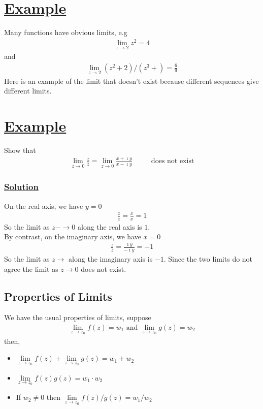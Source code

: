 \documentclass[12pt]{report}
\newcommand{\ubt}[1]{\textbf{\underline{#1}}}
\newcommand{\zbar}{\overline{z}}
\newcommand{\imaginary}{\imath}
\newcommand{\example}[1]{\section*{\ubt{Example #1}}}
\newcommand{\solution}{\subsubsection{\ubt{Solution}}}
\begin{document}
	\example{}
	Many functions have obvious limits, e.g
	\begin{eqnarray*}
		\lim\limits_{z\rightarrow 2} z^2 = 4
	\end{eqnarray*}
	and
	\begin{eqnarray*}
		\lim\limits_{z\rightarrow 2} (z^2+2)/(z^3+) = \frac{6}{9}
	\end{eqnarray*}
	Here is an example of the limit that doesn't exist because different sequences give different limits.
	\example{}
	Show that
	\begin{eqnarray*}
		\lim\limits_{z\rightarrow 0}\frac{z}{\zbar} = \lim\limits_{z\rightarrow 0} \frac{x+\imaginary y}{x - \imaginary y} \text{ ~~~~~~~does not exist}
	\end{eqnarray*}
	\solution
	On the real axis, we have $y=0$
	\begin{eqnarray*}
		\frac{z}{\zbar} = \frac{x}{x} = 1
	\end{eqnarray*}
	So the limit as $z-\rightarrow 0$ along the real axis is $1$. \\
	By contrast, on the imaginary axis, we have $x=0$
	\begin{eqnarray*}
		\frac{z}{\zbar} = \frac{\imaginary y}{-\imaginary y} = -1
	\end{eqnarray*}
	So the limit as $z\rightarrow$ along the imaginary axis is $-1$. Since the two limits do not agree the limit as $z\rightarrow 0$ does not exist.
	
	\subsection{Properties of Limits}
	We have the usual properties of limits, suppose
	\begin{eqnarray}
		\lim\limits_{z\rightarrow z_0} f(z) = w_1 \text{ and } \lim\limits_{z\rightarrow z_0} g(z) = w_2
	\end{eqnarray}
	then,
	\begin{itemize}
		\item $\lim\limits_{z\rightarrow z_0} f(z) + \lim\limits_{z\rightarrow z_0} g(z) = w_1 + w_2 $
		\item $\lim\limits_{z\rightarrow z_0} f(z)g(z) = w_1 \cdot w_2$
		\item If $w_2 \neq 0$ then $\lim\limits_{z\rightarrow z_0} f(z)/g(z) = w_1/w_2$
	\end{itemize}
	
\end{document}
